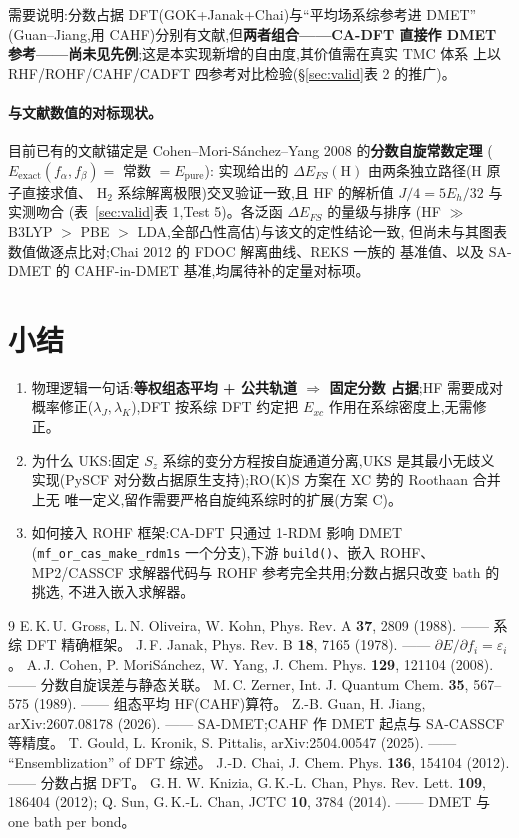 \documentclass[11pt,a4paper]{ctexart}
\begin{document}
需要说明:分数占据 DFT(GOK+Janak+Chai)与``平均场系综参考进 DMET''
(Guan--Jiang,用 CAHF)分别有文献,但\textbf{两者组合——CA-DFT 直接作
DMET 参考——尚未见先例};这是本实现新增的自由度,其价值需在真实 TMC 体系
上以 RHF/ROHF/CAHF/CADFT 四参考对比检验(§\ref{sec:valid}表 2 的推广)。

\paragraph{与文献数值的对标现状。}目前已有的文献锚定是
Cohen--Mori-S\'anchez--Yang 2008 的\textbf{分数自旋常数定理}
($E_{\mathrm{exact}}(f_\alpha,f_\beta)=$ 常数 $=E_{\mathrm{pure}}$):
实现给出的 $\Delta E_{FS}(\mathrm{H})$ 由两条独立路径(H 原子直接求值、
H$_2$ 系综解离极限)交叉验证一致,且 HF 的解析值 $J/4=5E_h/32$ 与实测吻合
(表~\ref{sec:valid}表 1,Test 5)。各泛函 $\Delta E_{FS}$ 的量级与排序
(HF $\gg$ B3LYP $>$ PBE $>$ LDA,全部凸性高估)与该文的定性结论一致,
但尚未与其图表数值做逐点比对;Chai 2012 的 FDOC 解离曲线、REKS 一族的
基准值、以及 SA-DMET 的 CAHF-in-DMET 基准,均属待补的定量对标项。

\section{小结}

\begin{enumerate}
\item 物理逻辑一句话:\textbf{等权组态平均 + 公共轨道 $\Rightarrow$ 固定分数
占据};HF 需要成对概率修正($\lambda_J,\lambda_K$),DFT 按系综 DFT 约定把
$E_{xc}$ 作用在系综密度上,无需修正。
\item 为什么 UKS:固定 $S_z$ 系综的变分方程按自旋通道分离,UKS 是其最小无歧义
实现(PySCF 对分数占据原生支持);RO(K)S 方案在 XC 势的 Roothaan 合并上无
唯一定义,留作需要严格自旋纯系综时的扩展(方案 C)。
\item 如何接入 ROHF 框架:CA-DFT 只通过 1-RDM 影响 DMET
(\texttt{mf\_or\_cas\_make\_rdm1s} 一个分支),下游 \texttt{build()}、嵌入
ROHF、MP2/CASSCF 求解器代码与 ROHF 参考完全共用;分数占据只改变 bath 的挑选,
不进入嵌入求解器。
\end{enumerate}

\begin{thebibliography}{9}
 E.\,K.\,U. Gross, L.\,N. Oliveira, W. Kohn,
  Phys. Rev. A \textbf{37}, 2809 (1988). —— 系综 DFT 精确框架。
 J.\,F. Janak, Phys. Rev. B \textbf{18}, 7165 (1978). ——
  $\partial E/\partial f_i = \varepsilon_i$。
 A.\,J. Cohen, P. Mori\-S\'anchez, W. Yang,
  J. Chem. Phys. \textbf{129}, 121104 (2008). —— 分数自旋误差与静态关联。
 M.\,C. Zerner, Int. J. Quantum Chem. \textbf{35}, 567--575 (1989).
  —— 组态平均 HF(CAHF)算符。
 Z.-B. Guan, H. Jiang, arXiv:2607.08178 (2026). ——
  SA-DMET;CAHF 作 DMET 起点与 SA-CASSCF 等精度。
 T. Gould, L. Kronik, S. Pittalis, arXiv:2504.00547 (2025). ——
  ``Ensemblization'' of DFT 综述。
 J.-D. Chai, J. Chem. Phys. \textbf{136}, 154104 (2012). ——
  分数占据 DFT。
 G.\,H. W. Knizia, G.\,K.-L. Chan, Phys. Rev. Lett. \textbf{109},
  186404 (2012); Q. Sun, G.\,K.-L. Chan, JCTC \textbf{10}, 3784 (2014). ——
  DMET 与 one bath per bond。
\end{thebibliography}
\end{document}
